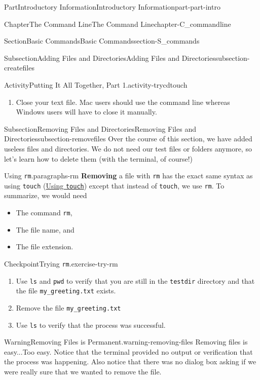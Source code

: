 \documentclass[oneside,10pt,]{book}
\newcommand{\mono}[1]{\texttt{#1}}
\newcommand{\terminology}[1]{\textbf{#1}}
\begin{document}
\begin{partptx}{Part}{Introductory Information}{}{Introductory Information}{}{}{part-part-intro}
\begin{chapterptx}{Chapter}{The Command Line}{}{The Command Line}{}{}{chapter-C_commandline}
\begin{sectionptx}{Section}{Basic Commands}{}{Basic Commands}{}{}{section-S_commands}
\begin{subsectionptx}{Subsection}{Adding Files and Directories}{}{Adding Files and Directories}{}{}{subsection-createfiles}
\begin{activity}{Activity}{Putting It All Together, Part 1.}{activity-trycdtouch}
\begin{enumerate}[font=\bfseries,label=(\alph*),ref=\alph*]
\item{}Close your text file. Mac users should use the command line whereas Windows users will have to close it manually.%
\end{enumerate}%
\end{activity}%
\end{subsectionptx}
%
%
\typeout{************************************************}
\typeout{************************************************}
%
\begin{subsectionptx}{Subsection}{Removing Files and Directories}{}{Removing Files and Directories}{}{}{subsection-removefiles}
%
Over the course of this section, we have added useless files and directories. We do not need our test files or folders anymore, so let's learn how to delete them (with the terminal, of course!)%
\begin{paragraphs}{Using \mono{rm}.}{paragraphs-rm}%
\index{\mono{rm}}%
%
\index{command line!\mono{rm}}%
\terminology{Removing} a file with \mono{rm} has the exact same syntax as using \mono{touch} (\hyperlink{paragraphs-touch}{Using \mono{touch}}) except that instead of \mono{touch}, we use \mono{rm}. To summarize, we would need%
\begin{itemize}[label=\textbullet]
\item{}The command \mono{rm},%
\item{}The file name, and%
\item{}The file extension.%
\end{itemize}
%
\begin{inlineexercise}{Checkpoint}{Trying \mono{rm}.}{exercise-try-rm}%
\begin{enumerate}[font=\bfseries,label=(\alph*),ref=\alph*]%
\item{}Use \mono{ls} and \mono{pwd} to verify that you are still in the \mono{testdir} directory and that the file \mono{my\_greeting.txt} exists.%
\item{}Remove the file \mono{my\_greeting.txt}%
\item{}Use \mono{ls} to verify that the process was successful.%
\end{enumerate}%
\end{inlineexercise}%
\begin{warning}{Warning}{Removing Files is Permanent.}{warning-removing-files}%
%
Removing files is easy...Too easy. Notice that the terminal provided no output or verification that the process was happening. Also notice that there was no dialog box asking if we were really sure that we wanted to remove the file.%

\end{warning}
\end{paragraphs}
\end{subsectionptx}
\end{sectionptx}
\end{chapterptx}
\end{partptx}
\end{document}
